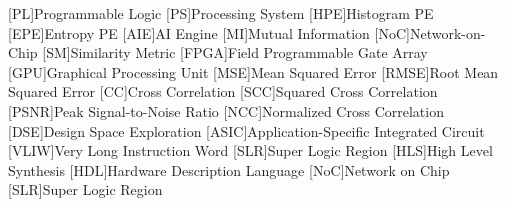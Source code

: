 [PL]{Programmable Logic}
[PS]{Processing System}
[HPE]{Histogram PE}
[EPE]{Entropy PE}
[AIE]{AI Engine}
[MI]{Mutual Information}
[NoC]{Network-on-Chip}
[SM]{Similarity Metric}
[FPGA]{Field Programmable Gate Array}
[GPU]{Graphical Processing Unit}
[MSE]{Mean Squared Error}
[RMSE]{Root Mean Squared Error}
[CC]{Cross Correlation}
[SCC]{Squared Cross Correlation}
[PSNR]{Peak Signal-to-Noise Ratio}
[NCC]{Normalized Cross Correlation}
[DSE]{Design Space Exploration}
[ASIC]{Application-Specific Integrated Circuit}
[VLIW]{Very Long Instruction Word}
[SLR]{Super Logic Region}
[HLS]{High Level Synthesis}
[HDL]{Hardware Description Language}
[NoC]{Network on Chip}
[SLR]{Super Logic Region}